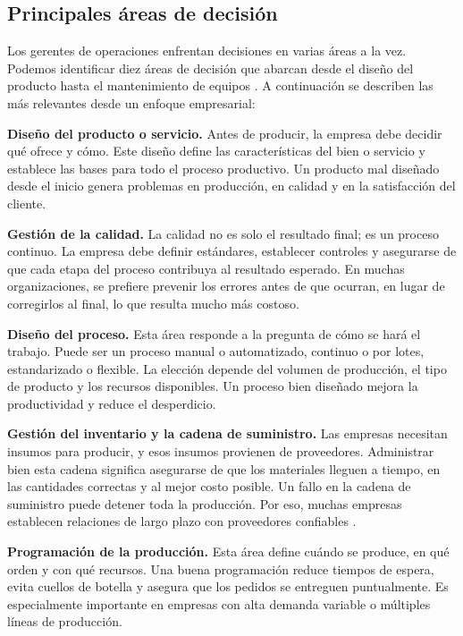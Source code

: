\subsection{Principales áreas de decisión}
Los gerentes de operaciones enfrentan decisiones en varias áreas a la vez. Podemos identificar diez áreas de decisión que abarcan desde el diseño del producto hasta el mantenimiento de equipos \parencite{heizer2014}. A continuación se describen las más relevantes desde un enfoque empresarial:

\textbf{Diseño del producto o servicio.} Antes de producir, la empresa debe decidir qué ofrece y cómo. Este diseño define las características del bien o servicio y establece las bases para todo el proceso productivo. Un producto mal diseñado desde el inicio genera problemas en producción, en calidad y en la satisfacción del cliente.

\textbf{Gestión de la calidad.} La calidad no es solo el resultado final; es un proceso continuo. La empresa debe definir estándares, establecer controles y asegurarse de que cada etapa del proceso contribuya al resultado esperado. En muchas organizaciones, se prefiere prevenir los errores antes de que ocurran, en lugar de corregirlos al final, lo que resulta mucho más costoso.

\textbf{Diseño del proceso.} Esta área responde a la pregunta de cómo se hará el trabajo. Puede ser un proceso manual o automatizado, continuo o por lotes, estandarizado o flexible. La elección depende del volumen de producción, el tipo de producto y los recursos disponibles. Un proceso bien diseñado mejora la productividad y reduce el desperdicio.

\textbf{Gestión del inventario y la cadena de suministro.} Las empresas necesitan insumos para producir, y esos insumos provienen de proveedores. Administrar bien esta cadena significa asegurarse de que los materiales lleguen a tiempo, en las cantidades correctas y al mejor costo posible. Un fallo en la cadena de suministro puede detener toda la producción. Por eso, muchas empresas establecen relaciones de largo plazo con proveedores confiables \parencite{krajewski2013}.

\textbf{Programación de la producción.} Esta área define cuándo se produce, en qué orden y con qué recursos. Una buena programación reduce tiempos de espera, evita cuellos de botella y asegura que los pedidos se entreguen puntualmente. Es especialmente importante en empresas con alta demanda variable o múltiples líneas de producción.

